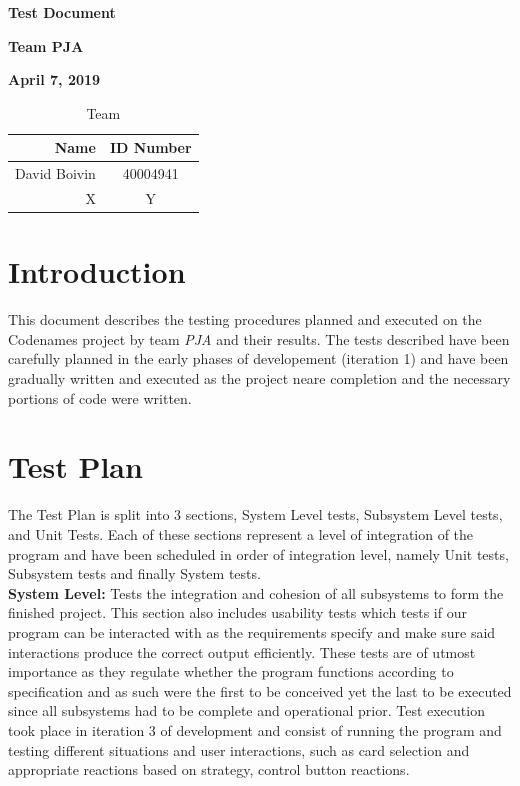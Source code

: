 \documentclass[12pt]{article}
\begin{document}
\vspace*{0.5in}
\centerline{\bf\Large Test Document}

\vspace*{0.5in}
\centerline{\bf\Large Team PJA}

\vspace*{0.5in}
\centerline{\bf\Large April 7, 2019}

\vspace*{1.5in}
\begin{table}[htbp]
\caption{Team}
\begin{center}
\begin{tabular}{|r | c|}
\hline
Name & ID Number \\
\hline\hline
David Boivin & 40004941\\
\hline
X & Y\\
\hline
\end{tabular}
\end{center}
\end{table}

\clearpage

\section{Introduction}

This document describes the testing procedures planned and executed on the Codenames project by team {\it PJA} and their results. The tests described have been carefully planned in the early phases of developement (iteration 1) and have been gradually written and executed as the project neare completion and the necessary portions of code were written.
\\

\section{Test Plan}

The Test Plan is split into 3 sections, System Level tests, Subsystem Level tests, and Unit Tests. Each of these sections represent a level of integration of the program and have been scheduled in order of integration level, namely Unit tests, Subsystem tests and finally System tests.
\\

{\bf System Level: } Tests the integration and cohesion of all subsystems to form the finished project. This section also includes usability tests which tests if our program can be interacted with as the requirements specify and make sure said interactions produce the correct output efficiently. These tests are of utmost importance as they regulate whether the program functions according to specification and as such were the first to be conceived yet the last to be executed since all subsystems had to be complete and operational prior. Test execution took place in iteration 3 of development and consist of running the program and testing different situations and user interactions, such as card selection and appropriate reactions based on strategy, control button reactions.
\\
\end{document}
